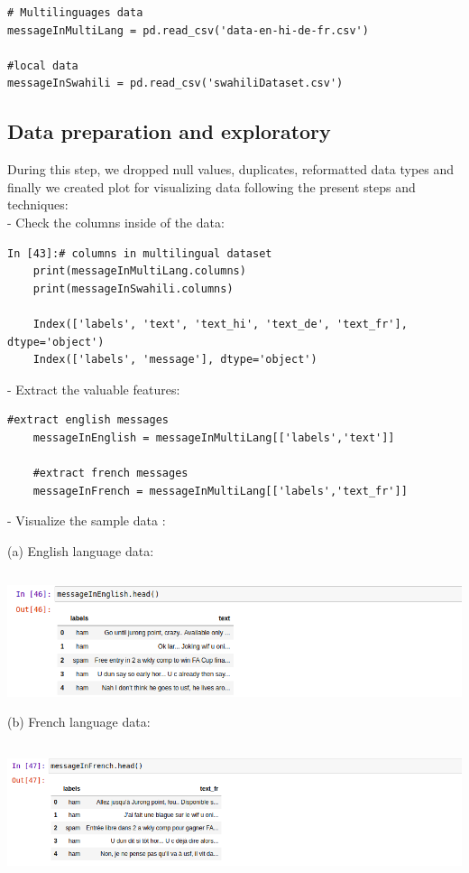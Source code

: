 \documentclass[12pt,a4paper, oneside]{book}
\begin{document}
\begin{lstlisting}[style=stylejupyter]
# Multilinguages data
messageInMultiLang = pd.read_csv('data-en-hi-de-fr.csv') 

#local data
messageInSwahili = pd.read_csv('swahiliDataset.csv')
\end{lstlisting}

\subsection{Data preparation and exploratory} 
During this step, we dropped null values, duplicates, reformatted data types and finally we created plot for visualizing data following the present steps and techniques:\\

- Check the columns inside of the data:
\begin{lstlisting}[style=stylejupyter]
In [43]:# columns in multilingual dataset 
	print(messageInMultiLang.columns) 
	print(messageInSwahili.columns) 
	
	Index(['labels', 'text', 'text_hi', 'text_de', 'text_fr'], dtype='object')
	Index(['labels', 'message'], dtype='object')
\end{lstlisting}
- Extract the valuable features:
\begin{lstlisting}[style=stylejupyter]
	#extract english messages
	messageInEnglish = messageInMultiLang[['labels','text']] 
	
	#extract french messages
	messageInFrench = messageInMultiLang[['labels','text_fr']]
\end{lstlisting}

- Visualize the sample data :

(a) English language data:

\includegraphics[height=4cm,width=1\linewidth]{CollectImages/headViewsEnglish}\\

(b) French language data:

\includegraphics[height=4cm,width=1\linewidth]{CollectImages/headViewsFrench}
\end{document}
